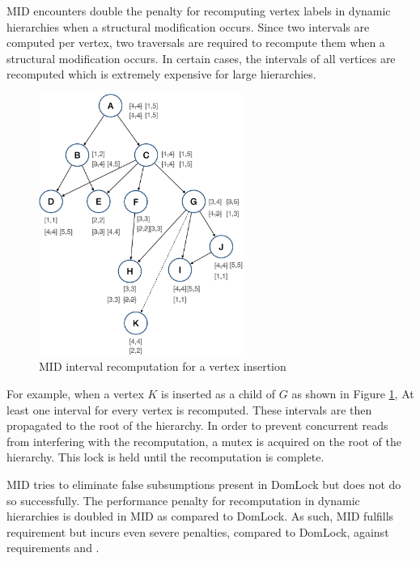 MID encounters double the penalty for recomputing vertex labels in dynamic hierarchies when a structural modification occurs. Since two intervals are computed per vertex, two traversals are required to recompute them when a structural modification occurs. In certain cases, the intervals of all vertices are recomputed which is extremely expensive for large hierarchies.

\begin{figure}[H]
    \centering
    \captionsetup{justification=centering}
    \includegraphics[width=0.6\textwidth]{figures/MID_example_with_SM.png}
    \caption{MID interval recomputation for a vertex insertion}
    \label{fig:MID_example_SM}
    
\end{figure}

For example, when a vertex $K$ is inserted as a child of $G$ as shown in Figure \ref{fig:MID_example_SM}, At least one interval for every vertex is recomputed. These intervals are then propagated to the root of the hierarchy. In order to prevent concurrent reads from interfering with the recomputation, a mutex is acquired on the root of the hierarchy. This lock is held until the recomputation is complete.

MID tries to eliminate false subsumptions present in DomLock but does not do so successfully. The performance penalty for recomputation in dynamic hierarchies is doubled in MID as compared to DomLock. As such, MID fulfills requirement \Rb but incurs even severe penalties, compared to DomLock, against requirements \Rc and \Rd.

